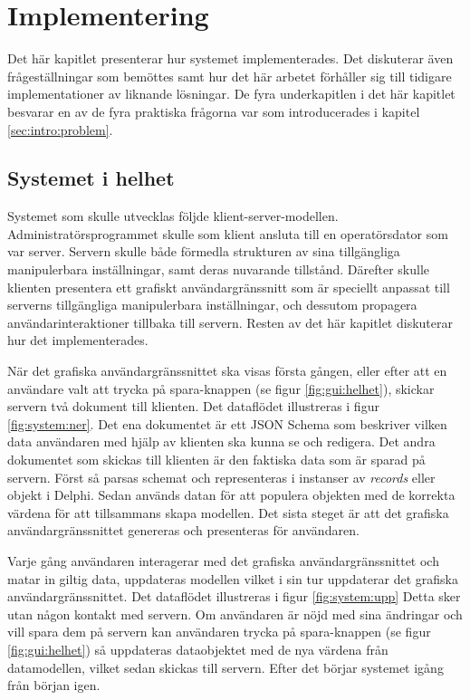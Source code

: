 \chapter{Implementering}
\label{sec:arbetet}
Det här kapitlet presenterar hur systemet implementerades. Det diskuterar även frågeställningar som bemöttes samt hur det här arbetet förhåller sig till tidigare implementationer av liknande lösningar. De fyra underkapitlen i det här kapitlet besvarar en av de fyra praktiska frågorna var som introducerades i kapitel \ref{sec:intro:problem}.

\section{Systemet i helhet}

Systemet som skulle utvecklas följde klient-server-modellen. Administratörsprogrammet skulle som klient ansluta till en operatörsdator som var server. Servern skulle både förmedla strukturen av sina tillgängliga manipulerbara inställningar, samt deras nuvarande tillstånd. Därefter skulle klienten presentera ett grafiskt användargränssnitt som är speciellt anpassat till serverns tillgängliga manipulerbara inställningar, och dessutom propagera användarinteraktioner tillbaka till servern. Resten av det här kapitlet diskuterar hur det implementerades.

När det grafiska användargränssnittet ska visas första gången, eller efter att en användare valt att trycka på spara-knappen (se figur \ref{fig:gui:helhet}), skickar servern två dokument till klienten. Det dataflödet illustreras i figur \ref{fig:system:ner}. Det ena dokumentet är ett JSON Schema som beskriver vilken data användaren med hjälp av klienten ska kunna se och redigera. Det andra dokumentet som skickas till klienten är den faktiska data som är sparad på servern. Först så parsas schemat och representeras i instanser av \textit{records} eller objekt i Delphi. Sedan används datan för att populera objekten med de korrekta värdena för att tillsammans skapa modellen. Det sista steget är att det grafiska användargränssnittet genereras och presenteras för användaren.

Varje gång användaren interagerar med det grafiska användargränssnittet och matar in giltig data, uppdateras modellen vilket i sin tur uppdaterar det grafiska användargränssnittet. Det dataflödet illustreras i figur \ref{fig:system:upp} Detta sker utan någon kontakt med servern. Om användaren är nöjd med sina ändringar och vill spara dem på servern kan användaren trycka på spara-knappen (se figur \ref{fig:gui:helhet}) så uppdateras dataobjektet med de nya värdena från datamodellen, vilket sedan skickas till servern. Efter det börjar systemet igång från början igen.


